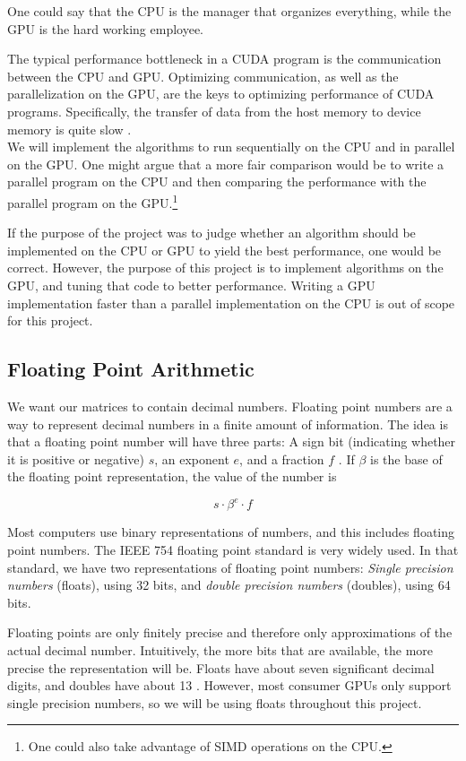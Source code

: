 One could say that the CPU is the manager that organizes everything, while the GPU is the hard working employee.

The typical performance bottleneck in a CUDA program is the communication between the CPU and GPU. Optimizing communication, as well as the parallelization on the GPU, are the keys to optimizing performance of CUDA programs. Specifically, the transfer of data from the host memory to device memory is quite slow \cite[Sect. 5.3.1]{nvidia:cudadoc}.\\

\noindent We will implement the algorithms to run sequentially on the CPU and in parallel on the GPU. One might argue that a more fair comparison would be to write a parallel program on the CPU and then comparing the performance with the parallel program on the GPU.\footnote{One could also take advantage of SIMD operations on the CPU.}

If the purpose of the project was to judge whether an algorithm should be implemented on the CPU or GPU to yield the best performance, one would be correct. However, the purpose of this project is to implement algorithms on the GPU, and tuning that code to better performance. Writing a GPU implementation faster than a parallel implementation on the CPU is out of scope for this project.

\subsection{Floating Point Arithmetic}

We want our matrices to contain decimal numbers. Floating point numbers are a way to represent decimal numbers in a finite amount of information. The idea is that a floating point number will have three parts: A sign bit (indicating whether it is positive or negative) $s$, an exponent $e$, and a fraction $f$ \cite[Sect. 6]{afternotes}. If $\beta$ is the base of the floating point representation, the value of the number is

\[s \cdot \beta^e \cdot f\]

Most computers use binary representations of numbers, and this includes floating point numbers. The IEEE 754 floating point standard is very widely used. In that standard, we have two representations of floating point numbers: \textit{Single precision numbers} (floats), using 32 bits, and \textit{double precision numbers} (doubles), using 64 bits. 

Floating points are only finitely precise and therefore only approximations of the actual decimal number. Intuitively, the more bits that are available, the more precise the representation will be. Floats have about seven significant decimal digits, and doubles have about 13 \cite[Sect. 6]{afternotes}. However, most consumer GPUs only support single precision numbers, so we will be using floats throughout this project.

